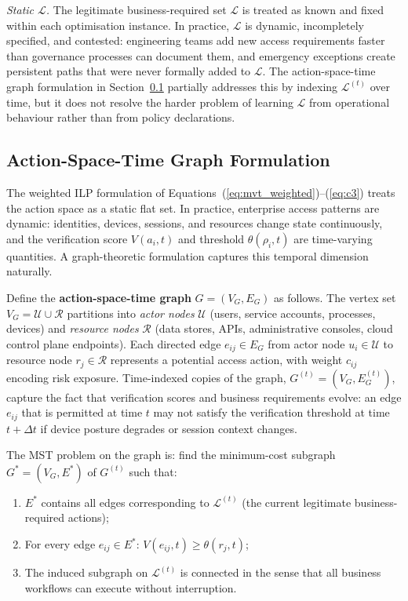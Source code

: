 \documentclass[acmlarge]{acmart}
\begin{document}
\textit{Static $\mathcal{L}$.} The legitimate business-required set $\mathcal{L}$
is treated as known and fixed within each optimisation instance. In practice,
$\mathcal{L}$ is dynamic, incompletely specified, and contested: engineering teams
add new access requirements faster than governance processes can document them, and
emergency exceptions create persistent paths that were never formally added to
$\mathcal{L}$. The action-space-time graph formulation in Section~\ref{sec:theory_graph} partially
addresses this by indexing $\mathcal{L}^{(t)}$ over time, but it does not resolve
the harder problem of learning $\mathcal{L}$ from operational behaviour rather than
from policy declarations.



\subsection{Action-Space-Time Graph Formulation}
\label{sec:theory_graph}

The weighted ILP formulation of Equations~(\ref{eq:mvt_weighted})--(\ref{eq:c3}) treats the action space as a static flat set.
In practice, enterprise access patterns are dynamic: identities, devices, sessions,
and resources change state continuously, and the verification score $V(a_i, t)$ and
threshold $\theta(\rho_i, t)$ are time-varying quantities. A graph-theoretic
formulation captures this temporal dimension naturally.

Define the \textbf{action-space-time graph} $G = (V_G, E_G)$ as follows. The vertex
set $V_G = \mathcal{U} \cup \mathcal{R}$ partitions into \textit{actor nodes}
$\mathcal{U}$ (users, service accounts, processes, devices) and \textit{resource
nodes} $\mathcal{R}$ (data stores, APIs, administrative consoles, cloud control plane
endpoints). Each directed edge $e_{ij} \in E_G$ from actor node $u_i \in \mathcal{U}$
to resource node $r_j \in \mathcal{R}$ represents a potential access action, with
weight $c_{ij}$ encoding risk exposure. Time-indexed copies of the graph,
$G^{(t)} = (V_G, E_G^{(t)})$, capture the fact that verification scores and
business requirements evolve: an edge $e_{ij}$ that is permitted at time $t$ may
not satisfy the verification threshold at time $t + \Delta t$ if device posture
degrades or session context changes.

The MST problem on the graph is: find the minimum-cost subgraph
$G^* = (V_G, E^*)$ of $G^{(t)}$ such that:
\begin{enumerate}
  \item $E^*$ contains all edges corresponding to $\mathcal{L}^{(t)}$ (the
        current legitimate business-required actions);
  \item For every edge $e_{ij} \in E^*$: $V(e_{ij}, t) \geq \theta(r_j, t)$;
  \item The induced subgraph on $\mathcal{L}^{(t)}$ is connected in the sense
        that all business workflows can execute without interruption.
\end{enumerate}
\end{document}
